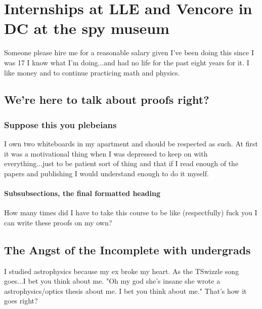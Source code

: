 \chapter{Internships at LLE and Vencore in DC at the spy museum}

Someone please hire me for a reasonable salary given I've been doing this since I was 17 I know what I'm doing...and had no life for the past eight years for it. I like money and to continue practicing math and physics. 

\section[Shorter Title]{We're here to talk about proofs right?}



\subsection{Suppose this you plebeians}

I own two whiteboards in my apartment and should be respected as such. At first it was a motivational thing when I was depressed to keep on with everything...just to be patient sort of thing and that if I read enough of the papers and publishing I would understand enough to do it myself. 

\subsubsection{Subsubsections, the final formatted heading}

How many times did I have to take this course to be like (respectfully) fuck you I can write these proofs on my own?

\section{The Angst of the Incomplete with undergrads}

I studied astrophysics because my ex broke my heart. As the TSwizzle song goes...I bet you think about me. "Oh my god she's insane she wrote a astrophysics/optics thesis about me. I bet you think about me." That's how it goes right?